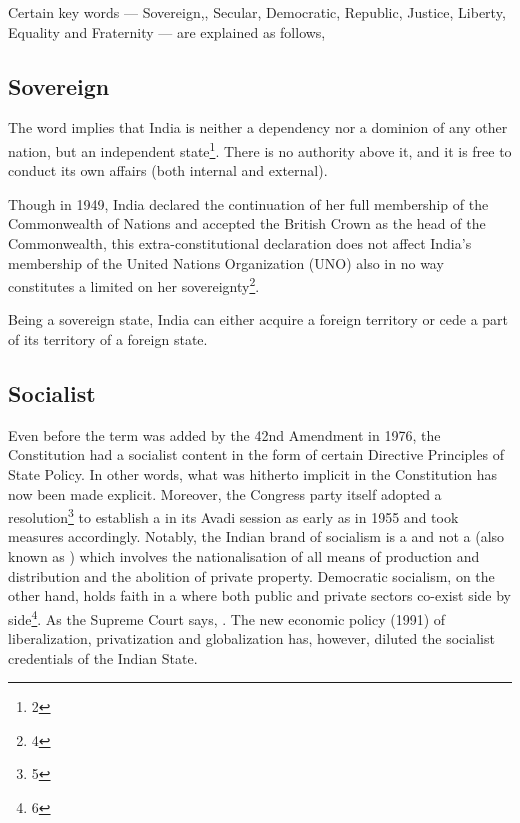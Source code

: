 Certain key words — Sovereign,, Secular, Democratic, Republic, Justice, Liberty, Equality and Fraternity — are explained as follows,

\subsection{Sovereign}

The word  implies that India is neither a dependency nor a dominion of any other nation, but an independent state\footnote{2}. There is no authority above it, and it is free to conduct its own affairs (both internal and external).

Though in 1949, India declared the continuation of her full membership of the Commonwealth of Nations and accepted the British Crown as the head of the Commonwealth, this extra-constitutional declaration does not affect India's membership of the United Nations Organization (UNO) also in no way constitutes a limited on her sovereignty\footnote{4}.

Being a sovereign state, India can either acquire a foreign territory or cede a part of its territory of a foreign state.

\subsection{Socialist}

Even before the term was added by the 42nd Amendment in 1976, the Constitution had a socialist content in the form of certain Directive Principles of State Policy. In other words, what was hitherto implicit in the Constitution has now been made explicit. Moreover, the Congress party itself adopted a resolution\footnote{5} to establish a  in its Avadi session as early as in 1955 and took measures accordingly. Notably, the Indian brand of socialism is a  and not a  (also known as ) which involves the nationalisation of all means of production and distribution and the abolition of private property. Democratic socialism, on the other hand, holds faith in a  where both public and private sectors co-exist side by side\footnote{6}. As the Supreme Court says, . The new economic policy (1991) of liberalization, privatization and globalization has, however, diluted the socialist credentials of the Indian State.


